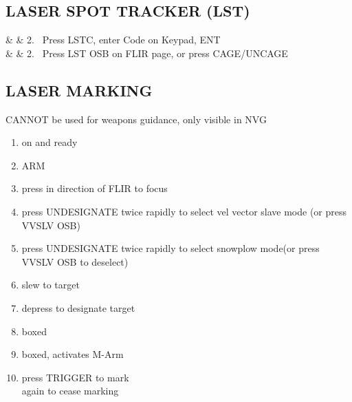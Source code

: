 \documentclass[fontInter]{TechCheck}
\begin{document}
	\subsection{LASER SPOT TRACKER (LST)}
	\begin{longtableitemize}
		& & 2. \ Press LSTC, enter Code on Keypad, ENT \\
		& & 2. \ Press LST OSB on FLIR page, or press CAGE/UNCAGE \\
		\end{longtableitemize}

	\subsection{LASER MARKING}
	 CANNOT be used for weapons guidance, only visible in NVG
	\begin{enumerate}
		\item {}\dotfill on and ready
		\item {}\dotfill ARM
		\item {}\dotfill press in direction of FLIR to focus
		\item {}\dotfill press UNDESIGNATE twice rapidly to select vel vector slave mode (or press VVSLV OSB)
		\item {}\dotfill press UNDESIGNATE twice rapidly to select snowplow mode(or press VVSLV OSB to deselect)
		\item {}\dotfill slew to target
		\item {}\dotfill depress to designate target
		\item {}\dotfill boxed
		\item {}\dotfill boxed, activates M-Arm
		\item {}\dotfill press TRIGGER to mark \\ \hfill again to cease marking
	\end{enumerate}
\end{document}
